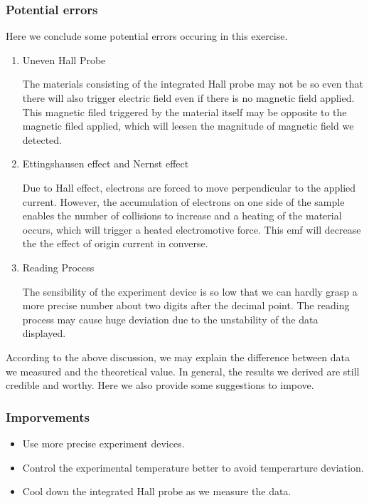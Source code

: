 \documentclass[a4paper]{article}
\begin{document}
\subsubsection{Potential errors}
\par Here we conclude some potential errors occuring in this exercise.
\begin{enumerate}[1.]
	\item Uneven Hall Probe \\
	      \par The materials consisting of the integrated Hall probe may not be so even that there will also trigger
	      electric field even if there is no magnetic field applied. This magnetic filed triggered by the material itself
	      may be opposite to the magnetic filed applied, which will leesen the magnitude of magnetic field we detected.
	\item Ettingshausen effect and Nernst effect \\
	      \par Due to Hall effect, electrons are forced to move perpendicular to the applied current. However,
	      the accumulation of electrons on one side of the sample enables the number of collisions to increase and a
	      heating of the material occurs, which will trigger a heated electromotive force. This emf will decrease the the
	      effect of origin current in converse.
	\item Reading Process \\
	      \par The sensibility of the experiment device is so low that we can hardly grasp a more precise number about two digits
	      after the decimal point. The reading process may cause huge deviation due to the unstability of the data displayed.
\end{enumerate}

According to the above discussion, we may explain the difference between data we measured and the theoretical value.
In general, the results we derived are still credible and worthy. Here we also provide some suggestions to impove.

\subsubsection{Imporvements}
\begin{itemize}
	\item Use more precise experiment devices.
	\item Control the experimental temperature better to avoid temperarture deviation.
	\item Cool down the integrated Hall probe as we measure the data.
\end{itemize}
\end{document}
